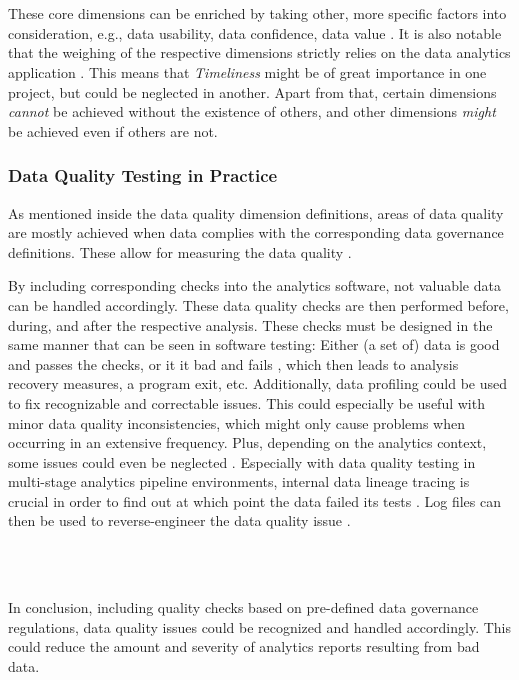 \\\

These core dimensions can be enriched by taking other, more specific factors into consideration, e.g., data usability, data confidence, data value \cite[13\psq]{Askham2013}. It is also notable that the weighing of the respective dimensions strictly relies on the data analytics application \cite[5]{Askham2013}. This means that \textit{Timeliness} might be of great importance in one project, but could be neglected in another. Apart from that, certain dimensions \textit{cannot} be achieved without the existence of others, and other dimensions \textit{might} be achieved even if others are not.

\subsubsection{Data Quality Testing in Practice}
As mentioned inside the data quality dimension definitions, areas of data quality are mostly achieved when data complies with the corresponding data governance definitions. These allow for measuring the data quality \cite{Schieferdecker2012}. 

By including corresponding checks into the analytics software, not valuable data can be handled accordingly. These data quality checks are then performed before, during, and after the respective analysis. These checks must be designed in the same manner that can be seen in software testing: Either (a set of) data is good and passes the checks, or it it bad and fails \cite[1]{Savanur2016}, which then leads to analysis recovery measures, a program exit, etc. Additionally, data profiling \cite{GartnerGlossary3} could be used to fix recognizable and correctable issues. This could especially be useful with minor data quality inconsistencies, which might only cause problems when occurring in an extensive frequency. Plus, depending on the analytics context, some issues could even be neglected \cite[678\psq]{Souibgui2019}. Especially with data quality testing in multi-stage analytics pipeline environments, internal data lineage tracing is crucial in order to find out at which point the data failed its tests \cite{Shen2019}. Log files can then be used to reverse-engineer the data quality issue \cite{Askham2019}.

\\\

In conclusion, including  quality checks based on pre-defined data governance regulations, data quality issues could be recognized and handled accordingly. This could reduce the amount and severity of analytics reports resulting from bad data.

